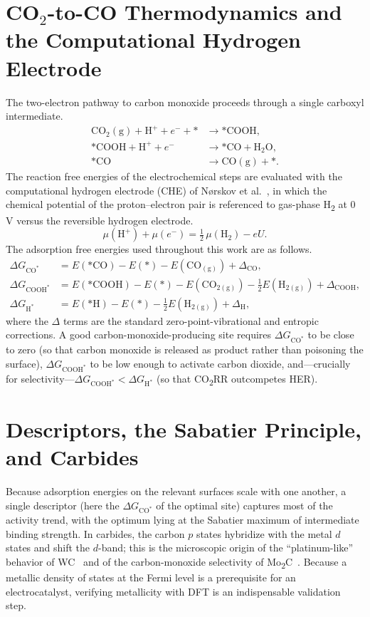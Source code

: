 \documentclass[11pt,a4paper]{report}
\providecommand{\SI}[2]{#1\,#2}
\newcommand{\dGCO}{\Delta G_{\mathrm{CO^*}}}
\newcommand{\dGH}{\Delta G_{\mathrm{H^*}}}
\newcommand{\dGCOOH}{\Delta G_{\mathrm{COOH^*}}}
\begin{document}
\section{CO\texorpdfstring{$_2$}{2}-to-CO Thermodynamics and the Computational Hydrogen Electrode}
The two-electron pathway to carbon monoxide proceeds through a single carboxyl intermediate.
\begin{align}
\mathrm{CO_2(g)} + \mathrm{H^+} + e^- + {*} &\rightarrow \mathrm{*COOH},\\
\mathrm{*COOH} + \mathrm{H^+} + e^- &\rightarrow \mathrm{*CO} + \mathrm{H_2O},\\
\mathrm{*CO} &\rightarrow \mathrm{CO(g)} + {*}.
\end{align}
The reaction free energies of the electrochemical steps are evaluated with the computational hydrogen electrode (CHE) of N\o{}rskov et al.~\cite{norskov2004}, in which the chemical potential of the proton--electron pair is referenced to gas-phase
H\textsubscript{2} at \SI{0}{V} versus the reversible hydrogen electrode.
\begin{equation}
\mu(\mathrm{H^+}) + \mu(e^-) = \tfrac{1}{2}\,\mu(\mathrm{H_2}) - eU .
\end{equation}
The adsorption free energies used throughout this work are as follows.
\begin{align}
\dGCO   &= E(\mathrm{*CO})   - E(*) - E(\mathrm{CO_{(g)}}) + \Delta_{\mathrm{CO}},\\
\dGCOOH &= E(\mathrm{*COOH}) - E(*) - E(\mathrm{CO_{2(g)}}) - \tfrac12 E(\mathrm{H_{2(g)}}) + \Delta_{\mathrm{COOH}},\\
\dGH    &= E(\mathrm{*H})    - E(*) - \tfrac12 E(\mathrm{H_{2(g)}}) + \Delta_{\mathrm{H}},
\end{align}
where the $\Delta$ terms are the standard zero-point-vibrational and entropic corrections. A good carbon-monoxide-producing site requires
$\dGCO$ to be close to zero (so that carbon monoxide is released as product rather than poisoning the surface), $\dGCOOH$ to be
low enough to activate carbon dioxide, and---crucially for selectivity---$\dGCOOH < \dGH$
(so that CO\textsubscript{2}RR outcompetes HER).

\section{Descriptors, the Sabatier Principle, and Carbides}
Because adsorption energies on the relevant surfaces scale with one another, a single descriptor (here the
$\dGCO$ of the optimal site) captures most of the activity trend, with the optimum lying at the Sabatier maximum of intermediate binding strength.
In carbides, the carbon $p$ states hybridize with the metal $d$ states and shift the $d$-band; this is the
microscopic origin of the ``platinum-like'' behavior of WC~\cite{levy1973} and of the carbon-monoxide selectivity of Mo\textsubscript{2}C~\cite{porosoff2014}.
Because a metallic density of states at the Fermi level is a prerequisite for an electrocatalyst, verifying metallicity
with DFT is an indispensable validation step.
\end{document}

